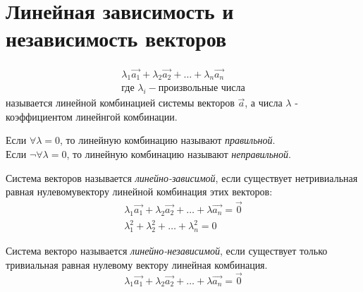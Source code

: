 \section{Линейная зависимость и независимость векторов}

\begin{definition}
  \begin{gather*}
    \lambda_1 \vec{a_1} + \lambda_2 \vec{a_2} + \ldots + \lambda_n \vec{a_n} \\
    \text{где } \lambda_i - \text{произвольные числа}
  \end{gather*}
  называется линейной комбинацией системы векторов $\vec{a}$, а числа $\lambda$ - коэффициентом линейнгой комбинации.  \\
\end{definition}

Если $\forall \lambda = 0$, то линейную комбинацию называют \textit{правильной}. \\
Если $\neg \forall \lambda = 0$, то линейную комбинацию называют \textit{неправильной}. 

\begin{definition}
Система векторов называется \textit{линейно-зависимой}, если существует нетривиальная равная нулевомувектору линейной комбинация этих векторов:
  \begin{gather*}
    \lambda_1 \vec{a_1} + \lambda_2 \vec{a_2} + \ldots + \lambda \vec{a_n} = \vec{0} \\
    \lambda_1^2 + \lambda_2^2 + \ldots + \lambda_n^2 = 0
  \end{gather*}
\end{definition}

\begin{definition}
  Система векторо называется \textit{линейно-независимой}, если существует только тривиальная равная нулевому вектору линейная комбинация.
  \[
    \lambda_1 \vec{a_1} + \lambda_2 \vec{a_2} + \ldots + \lambda \vec{a_n} = \vec{0}
  \] 
\end{definition}

